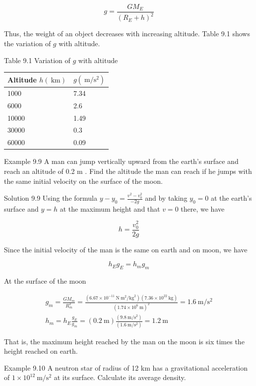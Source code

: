 \documentclass[10pt]{article}
\begin{document}
$$
g=\frac{G M_{E}}{\left(R_{E}+h\right)^{2}}
$$

Thus, the weight of an object decreases with increasing altitude. Table 9.1 shows the variation of $g$ with altitude.

Table 9.1 Variation of $g$ with altitude

\begin{center}
\begin{tabular}{l|l}
\hline
Altitude $h(\mathrm{~km})$ & $g\left(\mathrm{~m} / \mathrm{s}^{2}\right)$ \\
\hline
1000 & 7.34 \\
\hline
6000 & 2.6 \\
\hline
10000 & 1.49 \\
\hline
30000 & 0.3 \\
\hline
60000 & 0.09 \\
\hline
\end{tabular}
\end{center}

Example 9.9 A man can jump vertically upward from the earth's surface and reach an altitude of 0.2 m . Find the altitude the man can reach if he jumps with the same initial velocity on the surface of the moon.

Solution 9.9 Using the formula $y-y_{0}=\frac{v^{2}-v_{0}^{2}}{-2 g}$ and by taking $y_{0}=0$ at the earth's surface and $y=h$ at the maximum height and that $v=0$ there, we have

$$
h=\frac{v_{0}^{2}}{2 g}
$$

Since the initial velocity of the man is the same on earth and on moon, we have

$$
h_{E} g_{E}=h_{m} g_{m}
$$

At the surface of the moon

$$
\begin{gathered}
g_{m}=\frac{G M_{m}}{R_{m}^{2}}=\frac{\left(6.67 \times 10^{-11} \mathrm{~N} \mathrm{~m}^{2} / \mathrm{kg}^{2}\right)\left(7.36 \times 10^{22} \mathrm{~kg}\right)}{\left(1.74 \times 10^{6} \mathrm{~m}\right)^{2}}=1.6 \mathrm{~m} / \mathrm{s}^{2} \\
h_{m}=h_{E} \frac{g_{E}}{g_{m}}=(0.2 \mathrm{~m}) \frac{\left(9.8 \mathrm{~m} / \mathrm{s}^{2}\right)}{\left(1.6 \mathrm{~m} / \mathrm{s}^{2}\right)}=1.2 \mathrm{~m}
\end{gathered}
$$

That is, the maximum height reached by the man on the moon is six times the height reached on earth.

Example 9.10 A neutron star of radius of 12 km has a gravitational acceleration of $1 \times 10^{12} \mathrm{~m} / \mathrm{s}^{2}$ at its surface. Calculate its average density.
\end{document}
